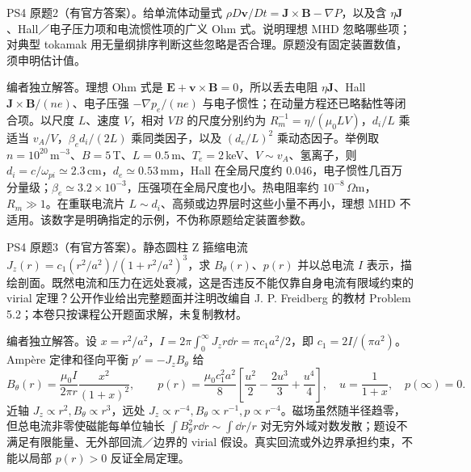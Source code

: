 \begin{exercise}\label{ex:hist02-4-2}
PS4 原题2（有官方答案）。给单流体动量式 $\rho D\mathbf v/Dt=\mathbf J\times\mathbf B-\nabla P$，以及含 $\eta\mathbf J$、Hall／电子压力项和电流惯性项的广义 Ohm 式。说明理想 MHD 忽略哪些项；对典型 tokamak 用无量纲排序判断这些忽略是否合理。原题没有固定装置数值，须申明估计值。
\end{exercise}
\begin{solution}
编者独立解答。理想 Ohm 式是 $\mathbf E+\mathbf v\times\mathbf B=0$，所以丢去电阻 $\eta\mathbf J$、Hall $\mathbf J\times\mathbf B/(ne)$、电子压强 $-\nabla p_e/(ne)$ 与电子惯性；在动量方程还已略黏性等闭合项。以尺度 $L$、速度 $V$，相对 $VB$ 的尺度分别约为 $R_m^{-1}=\eta/(\mu_0LV)$，$d_i/L$ 乘适当 $v_A/V$，$\beta_e d_i/(2L)$ 乘同类因子，以及 $(d_e/L)^2$ 乘动态因子。举例取 $n=10^{20}\,\mathrm{m^{-3}}$、$B=5\,$T、$L=0.5\,$m、$T_e=2\,$keV、$V\sim v_A$、氢离子，则 $d_i=c/\omega_{pi}\simeq2.3\,$cm，$d_e\simeq0.53\,$mm，Hall 在全局尺度约 $0.046$，电子惯性几百万分量级；$\beta_e\simeq3.2\times10^{-3}$，压强项在全局尺度也小。热电阻率约 $10^{-8}\,\Omega\mathrm m$，$R_m\gg1$。在重联电流片 $L\sim d_i$、高频或边界层时这些小量不再小，理想 MHD 不适用。该数字是明确指定的示例，不伪称原题给定装置参数。
\end{solution}

\begin{exercise}\label{ex:hist02-4-3}
PS4 原题3（有官方答案）。静态圆柱 Z 箍缩电流 $J_z(r)=c_1(r^2/a^2)/(1+r^2/a^2)^3$，求 $B_\theta(r)$、$p(r)$ 并以总电流 $I$ 表示，描绘剖面。既然电流和压力在远处衰减，这是否违反不能仅靠自身电流有限域约束的 virial 定理？公开作业给出完整题面并注明改编自 J. P. Freidberg 的教材 Problem 5.2；本卷只按课程公开题面求解，未复制教材。
\end{exercise}
\begin{solution}
编者独立解答。设 $x=r^2/a^2$，$I=2\pi\int_0^\infty J_zr\dd r=\pi c_1a^2/2$，即 $c_1=2I/(\pi a^2)$。Amp\`ere 定律和径向平衡 $p'=-J_zB_\theta$ 给
\begin{equation}B_\theta(r)=\frac{\mu_0I}{2\pi r}\frac{x^2}{(1+x)^2},\qquad
p(r)=\frac{\mu_0c_1^2a^2}{8}\left[\frac{u^2}{2}-\frac{2u^3}{3}+\frac{u^4}{4}\right],\quad u=\frac1{1+x},\quad p(\infty)=0.
\end{equation}
近轴 $J_z\propto r^2,B_\theta\propto r^3$，远处 $J_z\propto r^{-4},B_\theta\propto r^{-1},p\propto r^{-4}$。磁场虽然随半径趋零，但总电流非零使磁能每单位轴长 $\int B_\theta^2r\dd r\sim\int\dd r/r$ 对无穷外域对数发散；题设不满足有限能量、无外部回流／边界的 virial 假设。真实回流或外边界承担约束，不能以局部 $p(r)>0$ 反证全局定理。
\end{solution}
